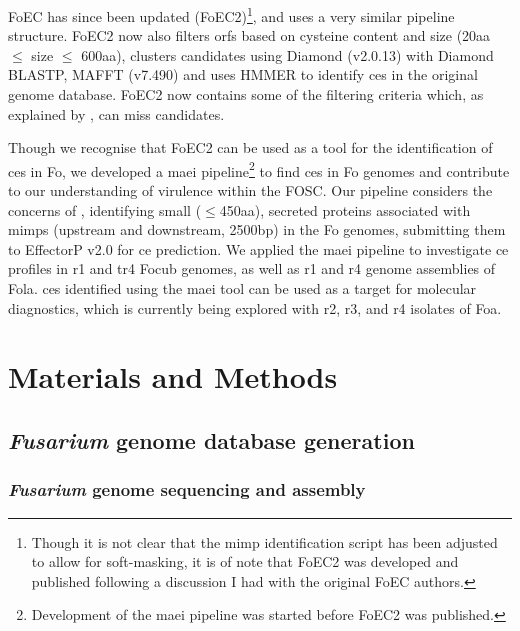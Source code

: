 FoEC has since been updated \parencite{FoEC2} (FoEC2)\footnote{Though it is not clear that the \ac{mimp} identification script has been adjusted to allow for soft-masking, it is of note that FoEC2 was developed and published following a discussion I had with the original FoEC authors.}, and uses a very similar pipeline structure. FoEC2 now also filters \acp{orf} based on cysteine content and size (20aa $\leq$ size $\leq$ 600aa), clusters candidates using Diamond (v2.0.13) with Diamond BLASTP, MAFFT (v7.490) \parencite{Katoh2019} and uses HMMER \parencite{Eddy2011} to identify \acp{ce} in the original genome database. FoEC2 now contains some of the filtering criteria which, as explained by \textcite{Sperschneider2015, LoPresti2015, Todd2022}, can miss candidates. 

Though we recognise that FoEC2 can be used as a tool for the identification of \acp{ce} in \ac{Fo}, we developed a \ac{maei} pipeline\footnote{Development of the \ac{maei} pipeline was started before FoEC2 was published.} to find \acp{ce} in \ac{Fo} genomes and contribute to our understanding of virulence within the \ac{FOSC}. Our pipeline considers the concerns of \textcite{Sperschneider2015, Todd2022}, identifying small ($\leq$450aa), secreted proteins associated with \acp{mimp} (upstream and downstream, 2500bp) in the \ac{Fo} genomes, submitting them to EffectorP v2.0 for \ac{ce} prediction. We applied the \ac{maei} pipeline to investigate \ac{ce} profiles in \ac{r1} and \ac{tr4} \ac{Focub} genomes, as well as \ac{r1} and \ac{r4} genome assemblies of \ac{Fola}. \acp{ce} identified using the \ac{maei} tool can be used as a target for molecular diagnostics, which is currently being explored with \ac{r2}, \ac{r3}, and \ac{r4} isolates of \ac{Foa}. 

\newpage
\section{Materials and Methods}

\subsection{\textit{Fusarium} genome database generation}\label{chap3:fusariumdb}

\subsubsection{\textit{Fusarium} genome sequencing and assembly}

